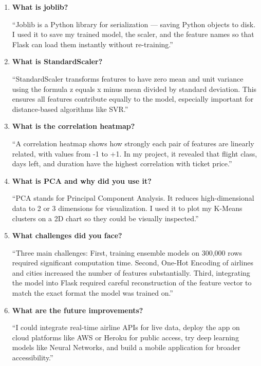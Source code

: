 \documentclass[12pt, a4paper]{article}
\begin{document}
\begin{enumerate}[leftmargin=*, label=\textbf{Q\arabic*.}]
\item \textbf{What is joblib?}
\begin{tipbox}[title=Answer]
    ``Joblib is a Python library for serialization — saving Python objects to disk. I used it to save my trained model, the scaler, and the feature names so that Flask can load them instantly without re-training.''
\end{tipbox}

\item \textbf{What is StandardScaler?}
\begin{tipbox}[title=Answer]
    ``StandardScaler transforms features to have zero mean and unit variance using the formula z equals x minus mean divided by standard deviation. This ensures all features contribute equally to the model, especially important for distance-based algorithms like SVR.''
\end{tipbox}

\item \textbf{What is the correlation heatmap?}
\begin{tipbox}[title=Answer]
    ``A correlation heatmap shows how strongly each pair of features are linearly related, with values from -1 to +1. In my project, it revealed that flight class, days left, and duration have the highest correlation with ticket price.''
\end{tipbox}

\item \textbf{What is PCA and why did you use it?}
\begin{tipbox}[title=Answer]
    ``PCA stands for Principal Component Analysis. It reduces high-dimensional data to 2 or 3 dimensions for visualization. I used it to plot my K-Means clusters on a 2D chart so they could be visually inspected.''
\end{tipbox}

\item \textbf{What challenges did you face?}
\begin{tipbox}[title=Answer]
    ``Three main challenges: First, training ensemble models on 300,000 rows required significant computation time. Second, One-Hot Encoding of airlines and cities increased the number of features substantially. Third, integrating the model into Flask required careful reconstruction of the feature vector to match the exact format the model was trained on.''
\end{tipbox}

\item \textbf{What are the future improvements?}
\begin{tipbox}[title=Answer]
    ``I could integrate real-time airline APIs for live data, deploy the app on cloud platforms like AWS or Heroku for public access, try deep learning models like Neural Networks, and build a mobile application for broader accessibility.''
\end{tipbox}


\end{enumerate}
\end{document}
